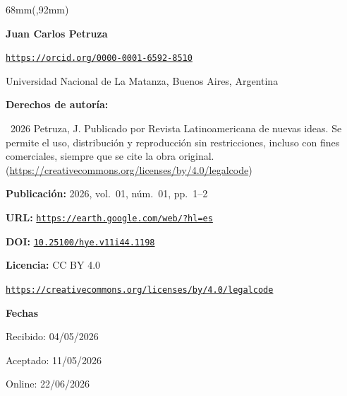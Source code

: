 \documentclass{article}
\newlength{\gbbloquex}
\begin{document}
\begin{textblock*}{68mm}(\gbbloquex,92mm)
{\setlength{\leftskip}{0pt}\setlength{\parindent}{0pt}%
\noindent\begin{minipage}[t]{68mm}
\sffamily\small\setlength{\parskip}{1pt}
{\bfseries\color{azulrevista}Juan Carlos Petruza}\par
{\scriptsize\texttt{\href{https://orcid.org/0000-0001-6592-8510}{https://orcid.org/0000-0001-6592-8510}}}\par
Universidad Nacional de La Matanza, Buenos Aires, Argentina\par
\vspace{6pt}
{\bfseries\color{azulrevista!70}Derechos de autor\'ia:}\par
\textcopyright\ 2026 Petruza, J. Publicado por Revista Latinoamericana de nuevas ideas. Se permite el uso, distribución y reproducción sin restricciones, incluso con fines comerciales, siempre que se cite la obra original. (\href{https://creativecommons.org/licenses/by/4.0/legalcode}{https://creativecommons.org/licenses/by/4.0/legalcode})\par\vspace{6pt}
{\bfseries\color{azulrevista!70}Publicación:} 2026, vol.~01, n\'um.~01, pp.~1--2\par\vspace{6pt}
{\bfseries\color{azulrevista!70}URL:} {\scriptsize\texttt{\href{https://earth.google.com/web/?hl=es}{https://earth.google.com/web/?hl=es}}}\par\vspace{6pt}
{\bfseries\color{azulrevista!70}DOI:} {\scriptsize\texttt{\href{https://doi.org/10.25100/hye.v11i44.1198}{10.25100/hye.v11i44.1198}}}\par\vspace{6pt}
{\bfseries\color{azulrevista!70}Licencia:} CC BY 4.0\par
{\scriptsize\texttt{\href{https://creativecommons.org/licenses/by/4.0/legalcode}{https://creativecommons.org/licenses/by/4.0/legalcode}}}\par
\vspace{6pt}
{\bfseries\color{azulrevista!70}Fechas}\par\vspace{2pt}
Recibido: 04/05/2026\par
Aceptado: 11/05/2026\par
Online: 22/06/2026\par
\vspace{6pt}
\vspace{6pt}

\end{minipage}}
\end{textblock*}
\end{document}
